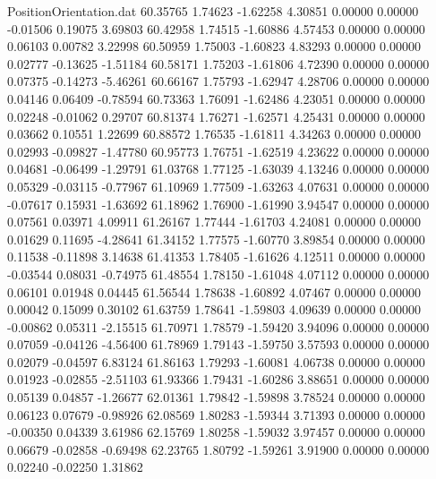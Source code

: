 \begin{filecontents}{PositionOrientation.dat}
  60.35765    1.74623   -1.62258     4.30851    0.00000    0.00000   -0.01506    0.19075    3.69803
  60.42958    1.74515   -1.60886     4.57453    0.00000    0.00000    0.06103    0.00782    3.22998
  60.50959    1.75003   -1.60823     4.83293    0.00000    0.00000    0.02777   -0.13625   -1.51184
  60.58171    1.75203   -1.61806     4.72390    0.00000    0.00000    0.07375   -0.14273   -5.46261
  60.66167    1.75793   -1.62947     4.28706    0.00000    0.00000    0.04146    0.06409   -0.78594
  60.73363    1.76091   -1.62486     4.23051    0.00000    0.00000    0.02248   -0.01062    0.29707
  60.81374    1.76271   -1.62571     4.25431    0.00000    0.00000    0.03662    0.10551    1.22699
  60.88572    1.76535   -1.61811     4.34263    0.00000    0.00000    0.02993   -0.09827   -1.47780
  60.95773    1.76751   -1.62519     4.23622    0.00000    0.00000    0.04681   -0.06499   -1.29791
  61.03768    1.77125   -1.63039     4.13246    0.00000    0.00000    0.05329   -0.03115   -0.77967
  61.10969    1.77509   -1.63263     4.07631    0.00000    0.00000   -0.07617    0.15931   -1.63692
  61.18962    1.76900   -1.61990     3.94547    0.00000    0.00000    0.07561    0.03971    4.09911
  61.26167    1.77444   -1.61703     4.24081    0.00000    0.00000    0.01629    0.11695   -4.28641
  61.34152    1.77575   -1.60770     3.89854    0.00000    0.00000    0.11538   -0.11898    3.14638
  61.41353    1.78405   -1.61626     4.12511    0.00000    0.00000   -0.03544    0.08031   -0.74975
  61.48554    1.78150   -1.61048     4.07112    0.00000    0.00000    0.06101    0.01948    0.04445
  61.56544    1.78638   -1.60892     4.07467    0.00000    0.00000    0.00042    0.15099    0.30102
  61.63759    1.78641   -1.59803     4.09639    0.00000    0.00000   -0.00862    0.05311   -2.15515
  61.70971    1.78579   -1.59420     3.94096    0.00000    0.00000    0.07059   -0.04126   -4.56400
  61.78969    1.79143   -1.59750     3.57593    0.00000    0.00000    0.02079   -0.04597    6.83124
  61.86163    1.79293   -1.60081     4.06738    0.00000    0.00000    0.01923   -0.02855   -2.51103
  61.93366    1.79431   -1.60286     3.88651    0.00000    0.00000    0.05139    0.04857   -1.26677
  62.01361    1.79842   -1.59898     3.78524    0.00000    0.00000    0.06123    0.07679   -0.98926
  62.08569    1.80283   -1.59344     3.71393    0.00000    0.00000   -0.00350    0.04339    3.61986
  62.15769    1.80258   -1.59032     3.97457    0.00000    0.00000    0.06679   -0.02858   -0.69498
  62.23765    1.80792   -1.59261     3.91900    0.00000    0.00000    0.02240   -0.02250    1.31862

\end{filecontents}
